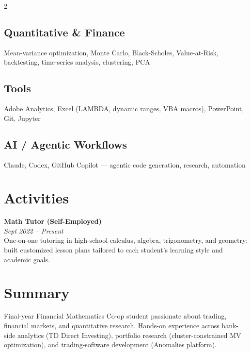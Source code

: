 \documentclass[10pt,letterpaper]{article}
\begin{document}
\begin{paracol}{2}
\subsection*{Quantitative \& Finance}
\small Mean-variance optimization, Monte Carlo, Black-Scholes, Value-at-Risk, backtesting, time-series analysis, clustering, PCA

\subsection*{Tools}
\small Adobe Analytics, Excel (LAMBDA, dynamic ranges, VBA macros), PowerPoint, Git, Jupyter

\subsection*{AI / Agentic Workflows}
\small Claude, Codex, GitHub Copilot --- agentic code generation, research, automation

\section*{Activities}
\noindent\textbf{Math Tutor (Self-Employed)}\\[1pt]
{\small\itshape\color{soft} Sept 2022 -- Present}\\[2pt]
\small One-on-one tutoring in high-school calculus, algebra, trigonometry, and geometry; built customized lesson plans tailored to each student's learning style and academic goals.

\switchcolumn

\section*{Summary}
Final-year Financial Mathematics Co-op student passionate about trading, financial markets, and quantitative research. Hands-on experience across bank-side analytics (TD Direct Investing), portfolio research (cluster-constrained MV optimization), and trading-software development (Anomalies platform).


\end{paracol}
\end{document}
